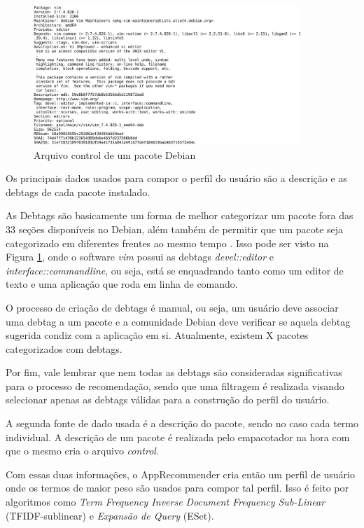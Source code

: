 \begin{figure}[h]
  \centering
  \includegraphics[width=0.9\textwidth]{figuras/control_pacote.eps}
  \caption{Arquivo control de um pacote Debian}
  \label{fig:control_pacote}
\end{figure}

Os principais dados usados para compor o perfil do usuário são a
descrição e as debtags de cada pacote instalado.

As Debtags são basicamente um forma de melhor categorizar um pacote fora das 33
seções disponíveis no Debian, além também de permitir que um pacote seja
categorizado em diferentes frentes ao mesmo tempo \cite{zini2005cute}. Isso pode ser visto na Figura
\ref{fig:control_pacote}, onde o software \textit{vim} possui as debtags
\textit{devel::editor} e \textit{interface::commandline}, ou seja, está se
enquadrando tanto como um editor de texto e uma aplicação que roda em linha de
comando.

O processo de criação de debtags é manual, ou seja, um usuário deve associar uma
debtag a um pacote e a comunidade Debian deve verificar se aquela debtag
sugerida condiz com a aplicação em si. Atualmente, existem X pacotes
categorizados com debtags.

Por fim, vale lembrar que nem todas as debtags são consideradas significativas
para o processo de recomendação, sendo que uma filtragem é realizada visando
selecionar apenas as debtags válidas para a construção do perfil do usuário.

A segunda fonte de dado usada é a descrição do pacote, sendo no caso cada termo
individual. A descrição de um pacote é realizada pelo empacotador na hora com
que o mesmo cria o arquivo \textit{control}.

Com essas duas informações, o AppRecommender cria então um perfil de usuário
onde os termos de maior peso são usados para compor tal perfil. Isso é feito por
algoritmos como \textit{Term Frequency Inverse Document Frequency Sub-Linear}
(TFIDF-sublinear) e \textit{Expansão de Query} (ESet).

